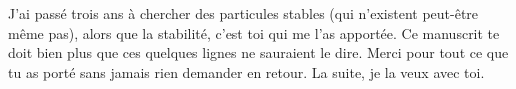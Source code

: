 \begin{chatwindow}[Remerciements]
{  J'ai passé trois ans à chercher des particules stables (qui n'existent peut-être même pas), alors que la stabilité, c'est toi qui me l'as apportée. Ce manuscrit te doit bien plus que ces quelques lignes ne sauraient le dire. Merci pour tout ce que tu as porté sans jamais rien demander en retour. La suite, je la veux avec toi.}
  \renewcommand{\chatplaceholder}{Crédits épuisés\dots}
\end{chatwindow}

\clearpage
\flushbottom